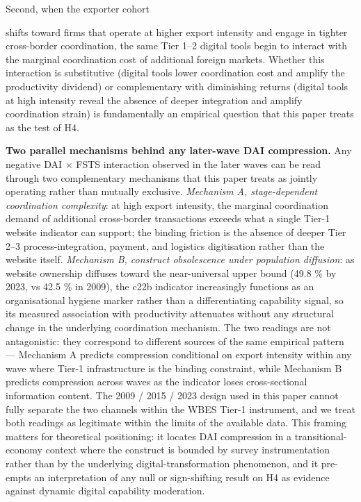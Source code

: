 \documentclass[12pt,a4paper]{article}
\begin{document}
Second, when the exporter cohort

shifts toward firms that operate at higher export intensity and engage
in tighter cross-border coordination, the same Tier 1--2 digital tools
begin to interact with the marginal coordination cost of additional
foreign markets. Whether this interaction is substitutive (digital tools
lower coordination cost and amplify the productivity dividend) or
complementary with diminishing returns (digital tools at high intensity
reveal the absence of deeper integration and amplify coordination
strain) is fundamentally an empirical question that this paper treats as
the test of H4.

\textbf{Two parallel mechanisms behind any later-wave DAI compression.}
Any negative DAI × FSTS interaction observed in the later waves can be
read through two complementary mechanisms that this paper treats as
jointly operating rather than mutually exclusive. \emph{Mechanism A,
stage-dependent coordination complexity}: at high export intensity, the
marginal coordination demand of additional cross-border transactions
exceeds what a single Tier-1 website indicator can support; the binding
friction is the absence of deeper Tier 2--3 process-integration,
payment, and logistics digitisation rather than the website itself.
\emph{Mechanism B, construct obsolescence under population diffusion}:
as website ownership diffuses toward the near-universal upper bound
(49.8 \% by 2023, vs 42.5 \% in 2009), the c22b indicator increasingly
functions as an organisational hygiene marker rather than a
differentiating capability signal, so its measured association with
productivity attenuates without any structural change in the underlying
coordination mechanism. The two readings are not antagonistic: they
correspond to different sources of the same empirical pattern ---
Mechanism A predicts compression conditional on export intensity within
any wave where Tier-1 infrastructure is the binding constraint, while
Mechanism B predicts compression across waves as the indicator loses
cross-sectional information content. The 2009 / 2015 / 2023 design used
in this paper cannot fully separate the two channels within the WBES
Tier-1 instrument, and we treat both readings as legitimate within the
limits of the available data. This framing matters for theoretical
positioning: it locates DAI compression in a transitional-economy
context where the construct is bounded by survey instrumentation rather
than by the underlying digital-transformation phenomenon, and it
pre-empts an interpretation of any null or sign-shifting result on H4 as
evidence against dynamic digital capability moderation.
\end{document}
